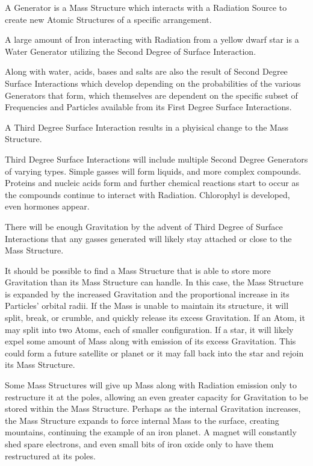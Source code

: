 \documentclass[12pt]{article}
\begin{document}
\begin{defn}
   A Generator is a Mass Structure which interacts with a Radiation Source to create new Atomic Structures of a specific arrangement.
\end{defn}

A large amount of Iron interacting with Radiation from a yellow dwarf star is a Water Generator utilizing the Second Degree of Surface Interaction.

Along with water, acids, bases and salts are also the result of Second Degree Surface Interactions which develop depending on the probabilities of the various Generators that form, which themselves are dependent on the specific subset of Frequencies and Particles available from its First Degree Surface Interactions.


\begin{thm}
   A Third Degree Surface Interaction results in a phyisical change to the Mass Structure.
\end{thm}

Third Degree Surface Interactions will include multiple Second Degree Generators of varying types. Simple gasses will form liquids, and more complex compounds. Proteins and nucleic acids form and further chemical reactions start to occur as the compounds continue to interact with Radiation. Chlorophyl is developed, even hormones appear. 

There will be enough Gravitation by the advent of Third Degree of Surface Interactions that any gasses generated will likely stay attached or close to the Mass Structure.

It should be possible to find a Mass Structure that is able to store more Gravitation than its Mass Structure can handle. In this case, the Mass Structure is expanded by the increased Gravitation and the proportional increase in its Particles' orbital radii. If the Mass is unable to maintain its structure, it will split, break, or crumble, and quickly release its excess Gravitation. If an Atom, it may split into two Atoms, each of smaller configuration. If a star, it will likely expel some amount of Mass along with emission of its excess Gravitation. This could form a future satellite or planet or it may fall back into the star and rejoin its Mass Structure.

Some Mass Structures will give up Mass along with Radiation emission only to restructure it at the poles, allowing an even greater capacity for Gravitation to be stored within the Mass Structure. Perhaps as the internal Gravitation increases, the Mass Structure expands to force internal Mass to the surface, creating mountains, continuing the example of an iron planet. A magnet will constantly shed spare electrons, and even small bits of iron oxide only to have them restructured at its poles.
\end{document}
